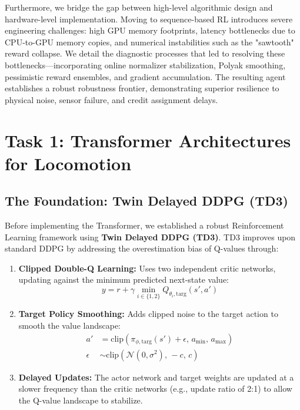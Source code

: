 \documentclass[11pt,a4paper]{article}
\begin{document}
Furthermore, we bridge the gap between high-level algorithmic design and hardware-level implementation. Moving to sequence-based RL introduces severe engineering challenges: high GPU memory footprints, latency bottlenecks due to CPU-to-GPU memory copies, and numerical instabilities such as the "sawtooth" reward collapse. We detail the diagnostic processes that led to resolving these bottlenecks—incorporating online normalizer stabilization, Polyak smoothing, pessimistic reward ensembles, and gradient accumulation. The resulting agent establishes a robust robustness frontier, demonstrating superior resilience to physical noise, sensor failure, and credit assignment delays.

\newpage

\section{Task 1: Transformer Architectures for Locomotion}

\subsection{The Foundation: Twin Delayed DDPG (TD3)}
Before implementing the Transformer, we established a robust Reinforcement Learning framework using \textbf{Twin Delayed DDPG (TD3)}. TD3 improves upon standard DDPG by addressing the overestimation bias of Q-values through:
\begin{enumerate}
    \item \textbf{Clipped Double-Q Learning:} Uses two independent critic networks, updating against the minimum predicted next-state value:
    \begin{equation}
    y = r + \gamma \min_{i \in \{1, 2\}} Q_{\theta_i, \text{targ}}(s', a')
    \end{equation}
    \item \textbf{Target Policy Smoothing:} Adds clipped noise to the target action to smooth the value landscape:
    \begin{equation}
    \begin{aligned}
    a' &= \text{clip}\left(\pi_{\phi, \text{targ}}(s') + \epsilon, \, a_{\min}, \, a_{\max}\right) \\
    \epsilon &\sim \text{clip}\left(\mathcal{N}(0, \sigma^2), \, -c, \, c\right)
    \end{aligned}
    \end{equation}
    \item \textbf{Delayed Updates:} The actor network and target weights are updated at a slower frequency than the critic networks (e.g., update ratio of 2:1) to allow the Q-value landscape to stabilize.
\end{enumerate}
\end{document}
